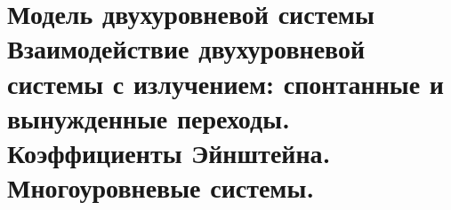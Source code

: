 \section{Модель двухуровневой системы Взаимодействие двухуровневой системы с излучением: спонтанные и вынужденные переходы. Коэффициенты Эйнштейна. Многоуровневые системы.}